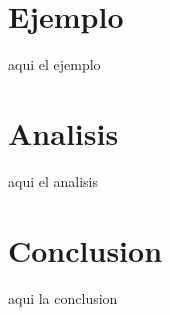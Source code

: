 \documentclass[preprint,12pt]{elsarticle}
\begin{document}
	
	


	

\section{Ejemplo}
	

aqui el ejemplo





\section{Analisis}
	

aqui el analisis

\newpage

	
	
\section{Conclusion}
aqui la conclusion

	
	

	
	
	\newpage
	
	
	
	
	
	
	
	
	
	
	
	
	
	
\end{document}
